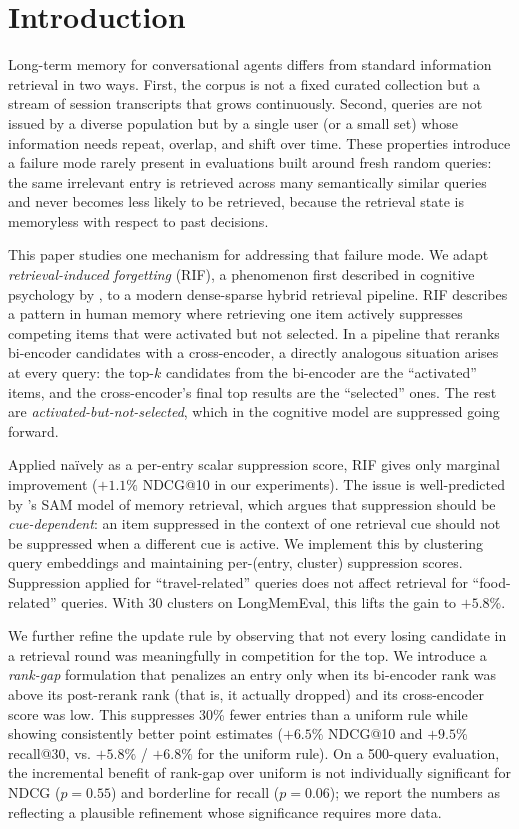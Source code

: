 \documentclass[11pt,a4paper]{article}
\begin{document}
\section{Introduction}

Long-term memory for conversational agents differs from standard information retrieval in two ways. First, the corpus is not a fixed curated collection but a stream of session transcripts that grows continuously. Second, queries are not issued by a diverse population but by a single user (or a small set) whose information needs repeat, overlap, and shift over time. These properties introduce a failure mode rarely present in evaluations built around fresh random queries: the same irrelevant entry is retrieved across many semantically similar queries and never becomes less likely to be retrieved, because the retrieval state is memoryless with respect to past decisions.

This paper studies one mechanism for addressing that failure mode. We adapt \emph{retrieval-induced forgetting} (RIF), a phenomenon first described in cognitive psychology by \citet{anderson1994rif}, to a modern dense-sparse hybrid retrieval pipeline. RIF describes a pattern in human memory where retrieving one item actively suppresses competing items that were activated but not selected. In a pipeline that reranks bi-encoder candidates with a cross-encoder, a directly analogous situation arises at every query: the top-$k$ candidates from the bi-encoder are the ``activated'' items, and the cross-encoder's final top results are the ``selected'' ones. The rest are \emph{activated-but-not-selected}, which in the cognitive model are suppressed going forward.

Applied na\"ively as a per-entry scalar suppression score, RIF gives only marginal improvement ($+1.1\%$ NDCG@10 in our experiments). The issue is well-predicted by \citet{raaijmakers1981sam}'s SAM model of memory retrieval, which argues that suppression should be \emph{cue-dependent}: an item suppressed in the context of one retrieval cue should not be suppressed when a different cue is active. We implement this by clustering query embeddings and maintaining per-(entry, cluster) suppression scores. Suppression applied for ``travel-related'' queries does not affect retrieval for ``food-related'' queries. With 30 clusters on LongMemEval, this lifts the gain to $+5.8\%$.

We further refine the update rule by observing that not every losing candidate in a retrieval round was meaningfully in competition for the top. We introduce a \emph{rank-gap} formulation that penalizes an entry only when its bi-encoder rank was above its post-rerank rank (that is, it actually dropped) and its cross-encoder score was low. This suppresses 30\% fewer entries than a uniform rule while showing consistently better point estimates ($+6.5\%$ NDCG@10 and $+9.5\%$ recall@30, vs. $+5.8\%$ / $+6.8\%$ for the uniform rule). On a 500-query evaluation, the incremental benefit of rank-gap over uniform is not individually significant for NDCG ($p=0.55$) and borderline for recall ($p=0.06$); we report the numbers as reflecting a plausible refinement whose significance requires more data.
\end{document}
